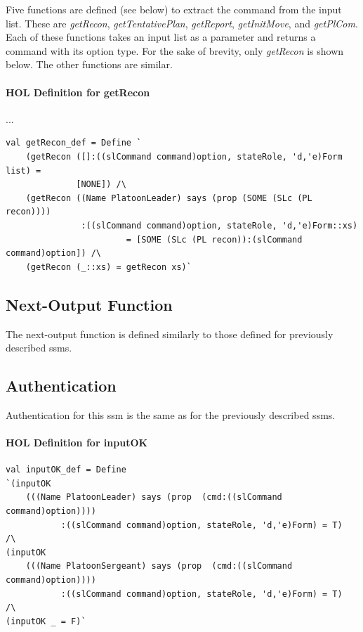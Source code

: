 \documentclass[../../main/main.tex]{subfiles}
\begin{document}
\HOLssmPlanPBTheoremsplanPBNSXXdef

Five functions are defined (see below) to extract the command from the input list.  These are \textit{getRecon}, \textit{getTentativePlan}, \textit{getReport}, \textit{getInitMove}, and \textit{getPlCom}.  Each of these functions takes an input list as a parameter and returns a command with its option type.  For the sake of brevity, only \textit{getRecon} is shown below.  The other functions are similar.

\paragraph*{HOL Definition for getRecon}...

\begin{lstlisting}
val getRecon_def = Define `
    (getRecon ([]:((slCommand command)option, stateRole, 'd,'e)Form list) =
    	      [NONE]) /\
    (getRecon ((Name PlatoonLeader) says (prop (SOME (SLc (PL recon))))
               :((slCommand command)option, stateRole, 'd,'e)Form::xs)
    	      	        = [SOME (SLc (PL recon)):(slCommand command)option]) /\
    (getRecon (_::xs) = getRecon xs)`
\end{lstlisting}

\subsection{Next-Output Function}
The next-output function is defined similarly to those defined for previously described \glspl{ssm}.

\HOLThmTag{ssmPlanPB}{planPBOut_def}\HOLssmPlanPBTheoremsplanPBOutXXdef


\subsection{Authentication}
Authentication for this \gls{ssm} is the same as for the previously described \glspl{ssm}.

\paragraph*{HOL Definition for inputOK}

\begin{lstlisting}
val inputOK_def = Define
`(inputOK
	(((Name PlatoonLeader) says (prop  (cmd:((slCommand command)option))))
	       :((slCommand command)option, stateRole, 'd,'e)Form) = T)  /\
(inputOK
	(((Name PlatoonSergeant) says (prop  (cmd:((slCommand command)option))))
	       :((slCommand command)option, stateRole, 'd,'e)Form) = T)  /\
(inputOK _ = F)`
\end{lstlisting}
\end{document}
